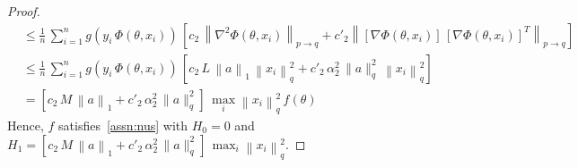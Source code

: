 \documentclass{article}
\newcommand{\normsq}[1]{\left\|#1 \right\|^{2}}
\newcommand{\norm}[1]{\left\|#1 \right\|}
\begin{document}
\begin{proof}
\begin{align*}
& \leq \frac{1}{n} \, \sum_{i = 1}^{n}  g(y_i \, \Phi(\theta, x_i )) \, \left[c_2 \, \norm{\nabla^2 \Phi(\theta, x_i)}_{p \to q} + c'_2 \norm{[\nabla \Phi(\theta, x_i)] \, [\nabla \Phi(\theta, x_i)]^{T}}_{p \to q} \right] \tag{Since $|g'(s)| \leq c_2 \, g(s)$ and $|g''(s)| \leq c_2' \, g(s)$ for all $s$} \\
& \leq \frac{1}{n} \, \sum_{i = 1}^{n}  g(y_i \, \Phi(\theta, x_i )) \, \left[c_2 \,  L \, \norm{a}_1 \, \normsq{x_i}_{q} + c'_2 \,  \alpha_2^2 \, \|a\|_q^2 \, \norm{x_i}_q^2 \right] \\
& = \left[c_2 \,  M \, \norm{a}_1 + c'_2 \,  \alpha_2^2 \, \|a\|_q^2 \right] \, \max_i \normsq{x_i}_{q} \, f(\theta) 
\end{align*}
Hence, $f$ satisfies~\cref{assn:nus} with $H_0=0$ and $H_1 = \left[c_2 \,  M \, \norm{a}_1 + c'_2 \,  \alpha_2^2 \, \|a\|_q^2 \right] \, \max_i \normsq{x_i}_{q}$. 


\end{proof}
\end{document}
